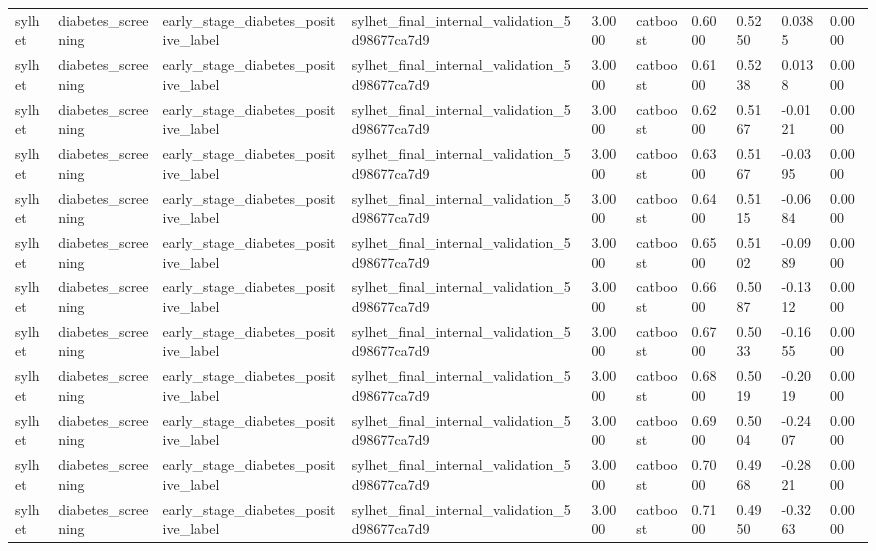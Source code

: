 \begin{tabular}{llllllllll}
sylhet & diabetes\_screening & early\_stage\_diabetes\_positive\_label & sylhet\_final\_internal\_validation\_5d98677ca7d9 & 3.0000 & catboost & 0.6000 & 0.5250 & 0.0385 & 0.0000 \\
sylhet & diabetes\_screening & early\_stage\_diabetes\_positive\_label & sylhet\_final\_internal\_validation\_5d98677ca7d9 & 3.0000 & catboost & 0.6100 & 0.5238 & 0.0138 & 0.0000 \\
sylhet & diabetes\_screening & early\_stage\_diabetes\_positive\_label & sylhet\_final\_internal\_validation\_5d98677ca7d9 & 3.0000 & catboost & 0.6200 & 0.5167 & -0.0121 & 0.0000 \\
sylhet & diabetes\_screening & early\_stage\_diabetes\_positive\_label & sylhet\_final\_internal\_validation\_5d98677ca7d9 & 3.0000 & catboost & 0.6300 & 0.5167 & -0.0395 & 0.0000 \\
sylhet & diabetes\_screening & early\_stage\_diabetes\_positive\_label & sylhet\_final\_internal\_validation\_5d98677ca7d9 & 3.0000 & catboost & 0.6400 & 0.5115 & -0.0684 & 0.0000 \\
sylhet & diabetes\_screening & early\_stage\_diabetes\_positive\_label & sylhet\_final\_internal\_validation\_5d98677ca7d9 & 3.0000 & catboost & 0.6500 & 0.5102 & -0.0989 & 0.0000 \\
sylhet & diabetes\_screening & early\_stage\_diabetes\_positive\_label & sylhet\_final\_internal\_validation\_5d98677ca7d9 & 3.0000 & catboost & 0.6600 & 0.5087 & -0.1312 & 0.0000 \\
sylhet & diabetes\_screening & early\_stage\_diabetes\_positive\_label & sylhet\_final\_internal\_validation\_5d98677ca7d9 & 3.0000 & catboost & 0.6700 & 0.5033 & -0.1655 & 0.0000 \\
sylhet & diabetes\_screening & early\_stage\_diabetes\_positive\_label & sylhet\_final\_internal\_validation\_5d98677ca7d9 & 3.0000 & catboost & 0.6800 & 0.5019 & -0.2019 & 0.0000 \\
sylhet & diabetes\_screening & early\_stage\_diabetes\_positive\_label & sylhet\_final\_internal\_validation\_5d98677ca7d9 & 3.0000 & catboost & 0.6900 & 0.5004 & -0.2407 & 0.0000 \\
sylhet & diabetes\_screening & early\_stage\_diabetes\_positive\_label & sylhet\_final\_internal\_validation\_5d98677ca7d9 & 3.0000 & catboost & 0.7000 & 0.4968 & -0.2821 & 0.0000 \\
sylhet & diabetes\_screening & early\_stage\_diabetes\_positive\_label & sylhet\_final\_internal\_validation\_5d98677ca7d9 & 3.0000 & catboost & 0.7100 & 0.4950 & -0.3263 & 0.0000 \\

\end{tabular}
